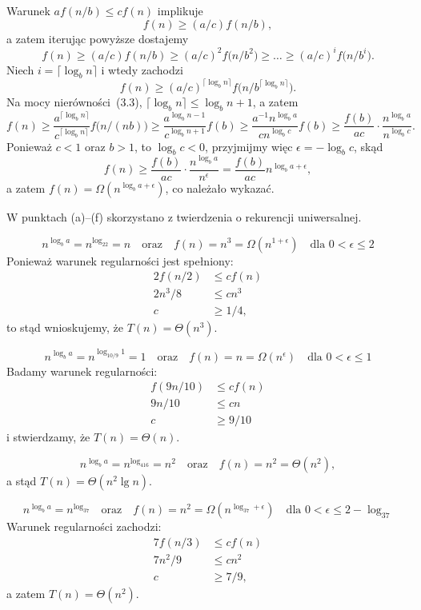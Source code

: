 \exercise %
Warunek $af(n/b)\le cf(n)$ implikuje
\[
	f(n) \ge (a/c)f(n/b),
\]
a zatem iterując powyższe dostajemy
\[
	f(n) \ge (a/c)f(n/b) \ge (a/c)^2f\bigl(n/b^2\bigr) \ge \dots \ge (a/c)^if\bigl(n/b^i\bigr).
\]
Niech $i=\lceil\log_bn\rceil$ i wtedy zachodzi
\[
	f(n) \ge (a/c)^{\lceil\log_bn\rceil}f\bigl(n/b^{\lceil\log_bn\rceil}\bigr).
\]
Na mocy nierówności~(3.3), $\lceil\log_bn\rceil\le\log_bn+1$, a zatem
\[
	f(n) \ge \frac{a^{\lceil\log_bn\rceil}}{c^{\lceil\log_bn\rceil}}f\bigl(n/(nb)\bigr) \ge \frac{a^{\log_bn-1}}{c^{\log_bn+1}}f(b) \ge \frac{a^{-1}n^{\log_ba}}{cn^{\log_bc}}f(b) \ge \frac{f(b)}{ac}\cdot\frac{n^{\log_ba}}{n^{\log_bc}}.
\]
Ponieważ $c<1$ oraz $b>1$, to $\log_bc<0$, przyjmijmy więc $\epsilon=-\log_bc$, skąd
\[
	f(n) \ge \frac{f(b)}{ac}\cdot\frac{n^{\log_ba}}{n^\epsilon} = \frac{f(b)}{ac}n^{\log_ba+\epsilon},
\]
a zatem $f(n)=\Omega(n^{\log_ba+\epsilon})$, co należało wykazać.

\problems

W punktach (a)\nobreakdash--(f) skorzystano z twierdzenia o rekurencji uniwersalnej.

\subproblem %
\[
	n^{\log_ba} = n^{\log_22} = n \quad\text{oraz}\quad f(n) = n^3 = \Omega(n^{1+\epsilon}) \quad\text{dla $0<\epsilon\le2$}
\]
Ponieważ warunek regularności jest spełniony:
\begin{align*}
	2f(n/2) &\le cf(n) \\
	2n^3\!/8 &\le cn^3 \\
	c &\ge 1/4,
\end{align*}
to stąd wnioskujemy, że $T(n)=\Theta(n^3)$.

\subproblem %
\[
	n^{\log_ba} = n^{\log_{10/9}1} = 1 \quad\text{oraz}\quad f(n) = n = \Omega(n^\epsilon) \quad\text{dla $0<\epsilon\le1$}
\]
Badamy warunek regularności:
\begin{align*}
	f(9n/10) &\le cf(n) \\
	9n/10 &\le cn \\
	c &\ge 9/10
\end{align*}
i stwierdzamy, że $T(n)=\Theta(n)$.

\subproblem %
\[
	n^{\log_ba} = n^{\log_416} = n^2 \quad\text{oraz}\quad f(n) = n^2 = \Theta(n^2),
\]
a stąd $T(n)=\Theta(n^2\lg n)$.

\subproblem %
\[
	n^{\log_ba} = n^{\log_37} \quad\text{oraz}\quad f(n) = n^2 = \Omega(n^{\log_37+\epsilon}) \quad\text{dla $0<\epsilon\le2-\log_37$}
\]
Warunek regularności zachodzi:
\begin{align*}
	7f(n/3) &\le cf(n) \\
	7n^2\!/9 &\le cn^2 \\
	c &\ge 7/9,
\end{align*}
a zatem $T(n)=\Theta(n^2)$.

